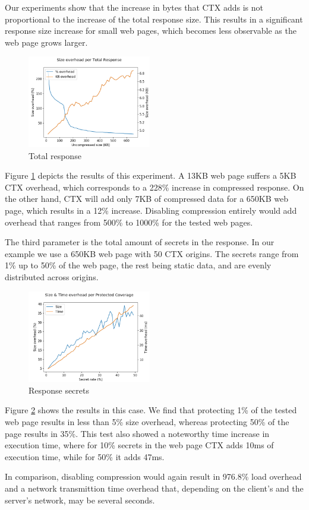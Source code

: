 Our experiments show that the increase in bytes that CTX adds is not
proportional to the increase of the total response size. This results in a
significant response size increase for small web pages, which becomes less
observable as the web page grows larger.

    \begin{figure}[thpb]
        \centering
            \includegraphics[width=0.48\textwidth]{experiments/total_response.png}
        \caption{Total response}
        \label{fig:total_response_ctx}
    \end{figure}

Figure \ref{fig:total_response_ctx} depicts the results of this experiment. A 13KB web page suffers a 5KB
CTX overhead, which corresponds to a 228\% increase in compressed response. On the
other hand, CTX will add only 7KB of compressed data for a 650KB web page, which
results in a 12\% increase. Disabling compression entirely would add overhead
that ranges from 500\% to 1000\% for the tested web pages.

The third parameter is the total amount of secrets in the response. In our
example we use a 650KB web page with 50 CTX origins. The secrets range from 1\%
up to 50\% of the web page, the rest being static data, and are evenly
distributed across origins.

    \begin{figure}[thpb]
        \centering
            \includegraphics[width=0.48\textwidth]{experiments/response_secrets.png}
        \caption{Response secrets}
        \label{fig:response_secrets_ctx}
    \end{figure}

Figure \ref{fig:response_secrets_ctx} shows the results in this case. We find that protecting 1\% of the
tested web page results in less than 5\% size overhead, whereas protecting 50\% of
the page results in 35\%. This test also showed a noteworthy time increase in
execution time, where for 10\% secrets in the web page CTX adds 10ms of
execution time, while for 50\% it adds 47ms.

In comparison, disabling compression would again result in 976.8\% load overhead
and a network transmittion time overhead that, depending on the client's and the
server's network, may be several seconds.


